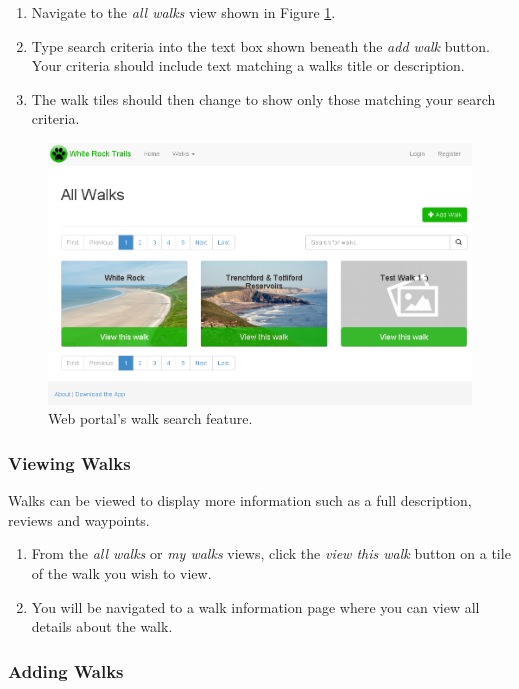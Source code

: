 \documentclass[11pt,a4paper]{report}
\begin{document}
\begin{enumerate}
\item Navigate to the \emph{all walks} view shown in Figure \ref{fig:all-walks-guide}.
\item Type search criteria into the text box shown beneath the \emph{add walk} button. Your criteria should include text matching a walks title or description.
\item The walk tiles should then change to show only those matching your search criteria.
\end{enumerate}

\begin{figure}[H]
\centering
\includegraphics[width=0.8\linewidth]{./img/webportal/all-walks}
\caption{Web portal's walk search feature.}
\label{fig:all-walks-guide}
\end{figure}

\subsubsection{Viewing Walks}

Walks can be viewed to display more information such as a full description, reviews and waypoints.

\begin{enumerate}
\item From the \emph{all walks} or \emph{my walks} views, click the \emph{view this walk} button on a tile of the walk you wish to view.
\item You will be navigated to a walk information page where you can view all details about the walk.
\end{enumerate}

\subsubsection{Adding Walks}
\end{document}
